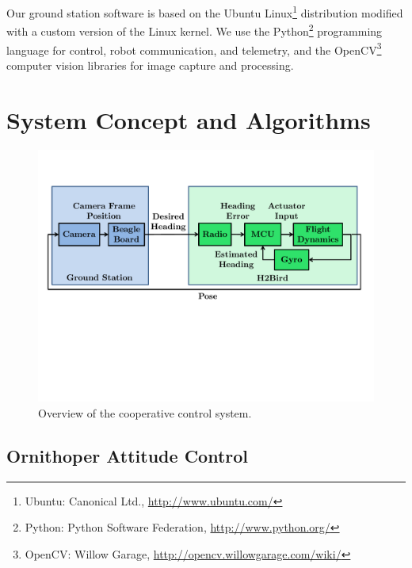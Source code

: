 \documentclass{aamas2013}
\begin{document}
Our ground station software is based on the Ubuntu Linux\footnote{\raggedright Ubuntu: 
Canonical Ltd., \href{http://www.ubuntu.com/}{http://www.ubuntu.com/}} distribution
modified with a custom version of the Linux kernel. We use the Python\footnote{\raggedright Python: Python Software Federation, \href{http://www.python.org/}
{http://www.python.org/}} programming language for control, robot communication, 
and telemetry, and the OpenCV\footnote{\raggedright OpenCV: Willow Garage, 
\href{http://opencv.willowgarage.com/wiki/}{http://opencv.willowgarage.com/wiki/}} 
computer vision libraries for image capture and processing.
\section{System Concept and Algorithms}

\begin{figure}[tb]
\centering
\includegraphics[width=\linewidth]{figures/process_flow.pdf}
\caption{Overview of the cooperative control system.}
\label{fig:process_flow}
\end{figure}

\subsection{Ornithoper Attitude Control}
\end{document}
